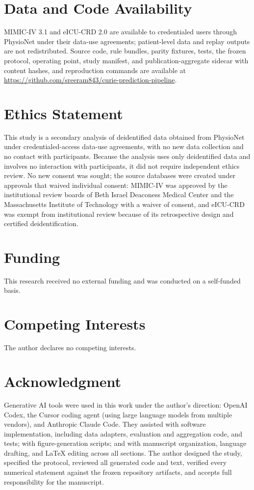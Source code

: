 \documentclass[journal]{IEEEtran}
\begin{document}
\section*{Data and Code Availability}
MIMIC-IV 3.1 and eICU-CRD 2.0 are available to credentialed users through
PhysioNet under their data-use agreements; patient-level data and replay
outputs are not redistributed. Source code, rule bundles, parity fixtures,
tests, the frozen protocol, operating point, study manifest, and
publication-aggregate sidecar with content hashes, and reproduction commands
are available at
\url{https://github.com/sreeram843/curie-prediction-pipeline}.

\section*{Ethics Statement}
This study is a secondary analysis of deidentified data obtained from
PhysioNet under credentialed-access data-use agreements, with no new data
collection and no contact with participants. Because the analysis
uses only deidentified data and involves no interaction with participants,
it did not require independent ethics review. No new consent was sought; the
source databases were created under approvals that waived individual
consent: MIMIC-IV was approved by the institutional review boards of Beth
Israel Deaconess Medical Center and the Massachusetts Institute of Technology
with a waiver of consent, and eICU-CRD was exempt from institutional review
because of its retrospective design and certified deidentification.

\section*{Funding}
This research received no external funding and was conducted on a self-funded
basis.

\section*{Competing Interests}
The author declares no competing interests.

\section*{Acknowledgment}
Generative AI tools were used in this work under the author's direction:
OpenAI Codex, the Cursor coding agent (using large language models from
multiple vendors), and Anthropic Claude Code. They assisted with software
implementation, including data adapters, evaluation and aggregation code, and
tests; with figure-generation scripts; and with manuscript organization,
language drafting, and LaTeX editing across all sections. The author
designed the study, specified the protocol, reviewed all generated code and
text, verified every numerical statement against the frozen repository
artifacts, and accepts full responsibility for the manuscript.
\end{document}

